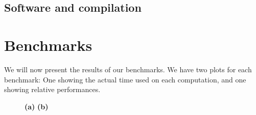 \subsection{Software and compilation}




\section{Benchmarks}
We will now present the results of our benchmarks. We have two plots
for each benchmark: One showing the actual time used on each
computation, and one showing relative performances.

\begin{figure}
	\centering
\begin{adjustbox}{minipage=1.3\textwidth,margin=0pt \smallskipamount,center}
\end{adjustbox}
  \caption{\textbf{(a)}  \textbf{(b)} }
\label{fig:binomial-cpu}
\end{figure}

